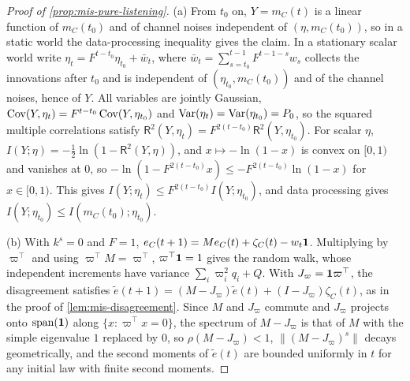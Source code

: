 \begin{proof}[Proof of \cref{prop:mis-pure-listening}]
(a) From $t_0$ on, $Y=m_C(t)$ is a linear function of $m_C(t_0)$ and of channel noises independent of $(\eta,m_C(t_0))$, so in a static world the data-processing inequality gives the claim. In a stationary scalar world write $\eta_t=F^{t-t_0}\eta_{t_0}+\bar w_t$, where $\bar w_t=\sum_{s=t_0}^{t-1}F^{t-1-s}w_s$ collects the innovations after $t_0$ and is independent of $(\eta_{t_0},m_C(t_0))$ and of the channel noises, hence of $Y$. All variables are jointly Gaussian, $\operatorname{Cov}(Y,\eta_t)=F^{t-t_0}\operatorname{Cov}(Y,\eta_{t_0})$ and $\operatorname{Var}(\eta_t)=\operatorname{Var}(\eta_{t_0})=P_0$, so the squared multiple correlations satisfy $\mathsf R^2(Y,\eta_t)=F^{2(t-t_0)}\mathsf R^2(Y,\eta_{t_0})$. For scalar $\eta$, $I(Y;\eta)=-\tfrac12\ln(1-\mathsf R^2(Y,\eta))$, and $x\mapsto-\ln(1-x)$ is convex on $[0,1)$ and vanishes at $0$, so $-\ln(1-F^{2(t-t_0)}x)\le-F^{2(t-t_0)}\ln(1-x)$ for $x\in[0,1)$. This gives $I(Y;\eta_t)\le F^{2(t-t_0)}I(Y;\eta_{t_0})$, and data processing gives $I(Y;\eta_{t_0})\le I(m_C(t_0);\eta_{t_0})$.

(b) With $k^s=0$ and $F=1$, $e_C(t+1)=Me_C(t)+\zeta_C(t)-w_t\mathbf{1}$. Multiplying by $\varpi^\top$ and using $\varpi^\top M=\varpi^\top$, $\varpi^\top\mathbf{1}=1$ gives the random walk, whose independent increments have variance $\sum_i\varpi_i^2q_i+Q$. With $J_\varpi=\mathbf{1}\varpi^\top$, the disagreement satisfies $\tilde e(t+1)=(M-J_\varpi)\tilde e(t)+(I-J_\varpi)\zeta_C(t)$, as in the proof of \cref{lem:mis-disagreement}. Since $M$ and $J_\varpi$ commute and $J_\varpi$ projects onto $\operatorname{span}(\mathbf{1})$ along $\{x:\varpi^\top x=0\}$, the spectrum of $M-J_\varpi$ is that of $M$ with the simple eigenvalue $1$ replaced by $0$, so $\rho(M-J_\varpi)<1$, $\lVert(M-J_\varpi)^s\rVert$ decays geometrically, and the second moments of $\tilde e(t)$ are bounded uniformly in $t$ for any initial law with finite second moments.


\end{proof}
